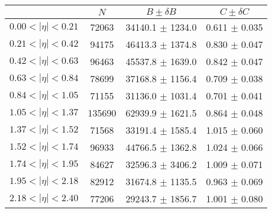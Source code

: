 \begin{tabular}{lccc}
\hline
    &   $N$   & $B \pm \delta B$  &  $C \pm \delta C$ \\
\hline
$0.00 < |\eta| <0.21$          & 72063      & 34140.1    $\pm$ 1234.0 & 0.611      $\pm$ 0.035 \\
$0.21 < |\eta| <0.42$          & 94175      & 46413.3    $\pm$ 1374.8 & 0.830      $\pm$ 0.047 \\
$0.42 < |\eta| <0.63$          & 96463      & 45537.8    $\pm$ 1639.0 & 0.842      $\pm$ 0.047 \\
$0.63 < |\eta| <0.84$          & 78699      & 37168.8    $\pm$ 1156.4 & 0.709      $\pm$ 0.038 \\
$0.84 < |\eta| <1.05$          & 71155      & 31136.0    $\pm$ 1031.4 & 0.701      $\pm$ 0.041 \\
$1.05 < |\eta| <1.37$          & 135690     & 62939.9    $\pm$ 1621.5 & 0.864      $\pm$ 0.048 \\
$1.37 < |\eta| <1.52$          & 71568      & 33191.4    $\pm$ 1585.4 & 1.015      $\pm$ 0.060 \\
$1.52 < |\eta| <1.74$          & 96933      & 44766.5    $\pm$ 1362.8 & 1.024      $\pm$ 0.066 \\
$1.74 < |\eta| <1.95$          & 84627      & 32596.3    $\pm$ 3406.2 & 1.009      $\pm$ 0.071 \\
$1.95 < |\eta| <2.18$          & 82912      & 31674.8    $\pm$ 1135.5 & 0.963      $\pm$ 0.069 \\
$2.18 < |\eta| <2.40$          & 77206      & 29243.7    $\pm$ 1856.7 & 1.001      $\pm$ 0.080 \\
\hline
\end{tabular}
